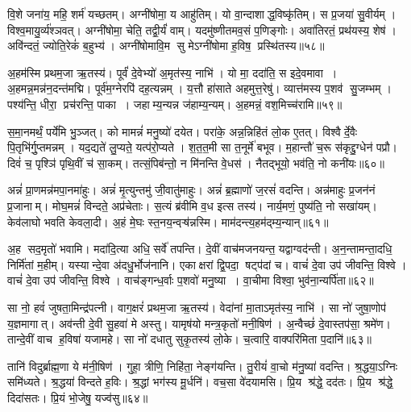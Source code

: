 वि॒शे जना॑य॒ महि॒ शर्म॑ यच्छतम्।
अग्नी॑षोमा॒ य आहु॑तिम्।
यो वा॒न्दाशाद्ध॒विष्कृ॑तिम्।
स प्र॒जया॑ सु॒वीर्यम्।
विश्व॒मायु॒र्व्य॑श्ञवत्।
अग्नी॑षोमा॒ चेति॒ तद्वी॒र्यं॑ वाम्।
यदमु॑ष्णीतमव॒सं प॒णिङ्गोः।
अवा॑तिरतं॒ प्रथ॑यस्य॒ शेष॑।
अवि॑न्दतं॒ ज्योति॒रेकं॑ ब॒हुभ्य॑।
अग्नी॑षोमावि॒म सु मेऽग्नी॑षोमा ह॒विष॒ प्रस्थि॑तस्य॥५८॥\anuvakamend[ज॒भा॒र॒ द्यौर॒ग्नेरु॒पस्थ॑ उप॒क्ष्यन्तो॑ बद्बधा॒नो व॒ध्वा॑ याद॑मानः समु॒द्रेऽह॑स॒ प्रस्थि॑तस्य]

अ॒हम॑स्मि प्रथम॒जा ऋ॒तस्य॑।
पूर्वं॑ दे॒वेभ्यो॑ अ॒मृत॑स्य॒ नाभि॑।
यो मा॒ ददा॑ति॒ स इदे॒वमावा।
अ॒हमन्न॒मन्न॑न॒दन्त॑मद्मि।
पूर्व॑म॒ग्नेरपि॑ दह॒त्यन्नम्।
य॒त्तौ हा॑साते अहमुत्त॒रेषु॑।
व्यात्त॑मस्य प॒शव॑ सु॒जम्भम्।
पश्य॑न्ति॒ धीरा॒ प्रच॑रन्ति॒ पाका।
जहाम्य॒न्यन्न ज॑हाम्य॒न्यम्।
अ॒हमन्नं॒ वश॒मिच्च॑रामि॥५९॥

स॒मा॒नमर्थं॒ पर्ये॑मि भु॒ञ्जत्।
को मामन्नं॑ मनु॒ष्यो॑ दयेत।
परा॑के॒ अन्न॒न्निहि॑तं लो॒क ए॒तत्।
विश्वैर्दे॒वैः पि॒तृभि॑र्गु॒प्तमन्नम्।
यद॒द्यते॑ लु॒प्यते॒ यत्प॑रो॒प्यते।
श॒त॒त॒मी सा त॒नूर्मे॑ बभूव।
म॒हान्तौ॑ च॒रू स॑कृद्दु॒ग्धेन॑ पप्रौ।
दिवं॑ च॒ पृश्ञि॑ पृथि॒वीं च॑ सा॒कम्।
तत्सं॒पिब॑न्तो॒ न मि॑नन्ति वे॒धस॑।
नैतद्भूयो॒ भव॑ति॒ नो कनी॑यः॥६०॥

अन्नं॑ प्रा॒णमन्न॑मपा॒नमा॑हुः।
अन्नं॑ मृ॒त्युन्तमु॑ जी॒वातु॑माहुः।
अन्नं॑ ब्र॒ह्माणो॑ ज॒रसं॑  वदन्ति।
अन्न॑माहुः प्र॒जन॑नं प्र॒जानाम्।
मोघ॒मन्नं॑ विन्दते॒ अप्र॑चेताः।
स॒त्यं ब्र॑वीमि व॒ध इत्स तस्य॑।
नार्य॒मणं॒ पुष्य॑ति॒ नो सखा॑यम्।
केव॑लाघो भवति केवला॒दी।
अ॒हं मे॒घः स्त॒नय॒न्वऱ़्ष॑न्नस्मि।
माम॑दन्त्य॒हम॑द्म्य॒न्यान्॥६१॥

अ॒ह सद॒मृतो॑ भवामि।
मदा॑दि॒त्या अधि॒ सर्वे॑ तपन्ति।
दे॒वीं वाच॑मजनयन्त॒ यद्वाग्वद॑न्ती।
अ॒न॒न्तामन्ता॒दधि॒ निर्मि॑तां म॒हीम्।
यस्यान्दे॒वा अ॑दधु॒र्भोज॑नानि।
एकाक्षरां द्वि॒पदा॒ षट्प॑दां च।
वाचं॑ दे॒वा उप॑ जीवन्ति॒ विश्वे।
वाचं॑ दे॒वा उप॑ जीवन्ति॒ विश्वे।
वाच॑ङ्गन्ध॒र्वाः प॒शवो॑ मनु॒ष्या।
वा॒चीमा विश्वा॒ भुव॑ना॒न्यर्पि॑ता॥६२॥

सा नो॒ हवं॑ जुषता॒मिन्द्र॑पत्नी।
वाग॒क्षरं॑ प्रथम॒जा ऋ॒तस्य॑।
वेदा॑नां मा॒ताऽमृत॑स्य॒ नाभि॑।
सा नो॑ जुषा॒णोप॑ य॒ज्ञमागात्।
अव॑न्ती दे॒वी सु॒हवा॑ मे अस्तु।
यामृष॑यो मन्त्र॒कृतो॑ मनी॒षिण॑।
अ॒न्वैच्छं॑ दे॒वास्तप॑सा॒ श्रमे॑ण।
तान्दे॒वीं वाच ह॒विषा॑ यजामहे।
सा नो॑ दधातु सुकृ॒तस्य॑ लो॒के।
च॒त्वारि॒ वाक्परि॑मिता प॒दानि॑॥६३॥

तानि॑ विदुर्ब्राह्म॒णा ये म॑नी॒षिण॑।
गुहा॒ त्रीणि॒ निहि॑ता॒ नेङ्ग॑यन्ति।
तु॒रीयं॑ वा॒चो म॑नु॒ष्या॑ वदन्ति।
श्र॒द्धया॒ऽग्निः समि॑ध्यते।
श्र॒द्धया॑ विन्दते ह॒विः।
श्र॒द्धां भग॑स्य मू॒र्धनि॑।
वच॒सा वे॑दयामसि।
प्रि॒य श्र॑द्धे॒ दद॑तः।
प्रि॒य श्र॑द्धे॒ दिदा॑सतः।
प्रि॒यं भो॒जेषु॒ यज्व॑सु॥६४॥

